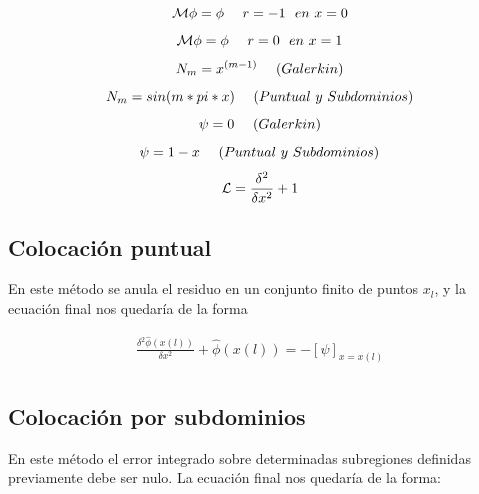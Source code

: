 \documentclass[11pt]{article}
\begin{document}
\begin{equation}
\mathcal{M}\phi = \phi \ \ \ \ r=-1 \ \ en \ x=0 \\
\end{equation}
\begin{equation}
\mathcal{M}\phi = \phi \ \ \ \ r=0 \ \ en \ x=1 \\
\end{equation}
\begin{equation}
N_m = x^{(m-1)} \ \ \ \ (Galerkin) \\
\end{equation}
\begin{equation}
N_m = sin(m*pi*x) \ \ \ \ (Puntual \ y \ Subdominios) \\
\end{equation}
\begin{equation}
\psi = 0 \ \ \ \ (Galerkin) \\
\end{equation}
\begin{equation}
\psi = 1-x \ \ \ \ (Puntual \ y \ Subdominios) \\
\end{equation}
\begin{equation}
\mathcal{L} = \frac{\delta^2}{\delta x^2} + 1\\
\end{equation}

\bigskip
\subsection{Colocaci\'on puntual}

En este m\'etodo se anula el residuo en un conjunto finito de puntos $x_l$, y la ecuaci\'on final nos quedar\'ia de la forma

\begin{equation}
\begin{split}
\frac{\delta^2\hat{\phi}(x(l))}{\delta x^2}+ \hat{\phi}(x(l)) = - \left[\psi \right]_{x=x(l)} \\ 
\end{split}
\end{equation}

\bigskip 
\subsection{Colocaci\'on por subdominios}

En este m\'etodo el error integrado sobre determinadas subregiones definidas previamente debe ser nulo. La ecuaci\'on final nos quedar\'ia de la forma:
\end{document}
